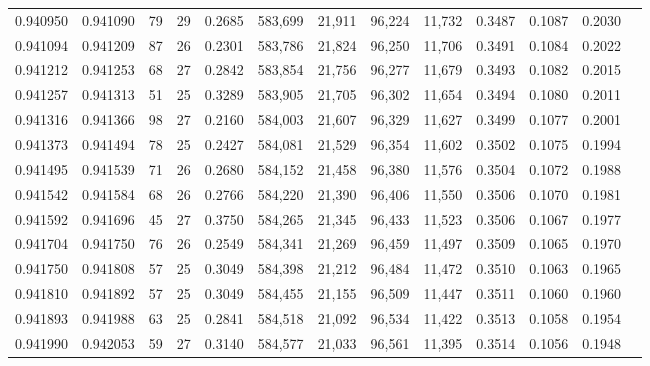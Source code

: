 \begin{tabular}{rrrrrrrrrrrrr}
0.940950 & 0.941090 &    79 &  29 &                                     0.2685 & 583,699 &  21,911 &  96,224 &  11,732 & 0.3487 & 0.1087 & 0.2030 \\
0.941094 & 0.941209 &    87 &  26 &                                     0.2301 & 583,786 &  21,824 &  96,250 &  11,706 & 0.3491 & 0.1084 & 0.2022 \\
0.941212 & 0.941253 &    68 &  27 &                                     0.2842 & 583,854 &  21,756 &  96,277 &  11,679 & 0.3493 & 0.1082 & 0.2015 \\
0.941257 & 0.941313 &    51 &  25 &                                     0.3289 & 583,905 &  21,705 &  96,302 &  11,654 & 0.3494 & 0.1080 & 0.2011 \\
0.941316 & 0.941366 &    98 &  27 &                                     0.2160 & 584,003 &  21,607 &  96,329 &  11,627 & 0.3499 & 0.1077 & 0.2001 \\
0.941373 & 0.941494 &    78 &  25 &                                     0.2427 & 584,081 &  21,529 &  96,354 &  11,602 & 0.3502 & 0.1075 & 0.1994 \\
0.941495 & 0.941539 &    71 &  26 &                                     0.2680 & 584,152 &  21,458 &  96,380 &  11,576 & 0.3504 & 0.1072 & 0.1988 \\
0.941542 & 0.941584 &    68 &  26 &                                     0.2766 & 584,220 &  21,390 &  96,406 &  11,550 & 0.3506 & 0.1070 & 0.1981 \\
0.941592 & 0.941696 &    45 &  27 &                                     0.3750 & 584,265 &  21,345 &  96,433 &  11,523 & 0.3506 & 0.1067 & 0.1977 \\
0.941704 & 0.941750 &    76 &  26 &                                     0.2549 & 584,341 &  21,269 &  96,459 &  11,497 & 0.3509 & 0.1065 & 0.1970 \\
0.941750 & 0.941808 &    57 &  25 &                                     0.3049 & 584,398 &  21,212 &  96,484 &  11,472 & 0.3510 & 0.1063 & 0.1965 \\
0.941810 & 0.941892 &    57 &  25 &                                     0.3049 & 584,455 &  21,155 &  96,509 &  11,447 & 0.3511 & 0.1060 & 0.1960 \\
0.941893 & 0.941988 &    63 &  25 &                                     0.2841 & 584,518 &  21,092 &  96,534 &  11,422 & 0.3513 & 0.1058 & 0.1954 \\
0.941990 & 0.942053 &    59 &  27 &                                     0.3140 & 584,577 &  21,033 &  96,561 &  11,395 & 0.3514 & 0.1056 & 0.1948 \\

\end{tabular}
